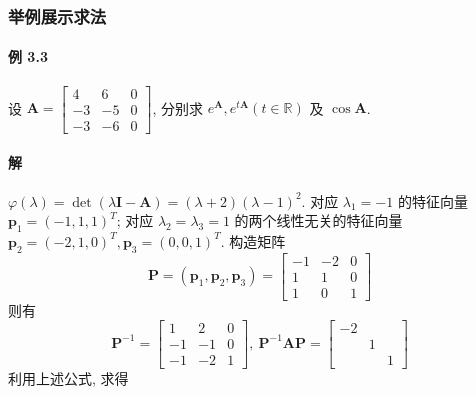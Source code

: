 \subsubsection{举例展示求法}

\paragraph*{例 3.3} 设 $\bm{A} = \begin{bmatrix}
    4 & 6 & 0 \\
    -3 & -5 & 0 \\
    -3 & -6 & 0
\end{bmatrix}$, 分别求 $e^{\bm{A}}, e^{t\bm{A}}(t\in \mathbb{R})$ 及 $\cos\bm{A}$.

\paragraph*{解} $\varphi(\lambda) = \det(\lambda\bm{I} - \bm{A}) = (\lambda + 2)(\lambda - 1)^2$. 对应
$\lambda_1 = -1$ 的特征向量 $\bm{p}_1 = (-1, 1, 1)^T$; 对应 $\lambda_2 = \lambda_3 = 1$ 的两个线性无关的特征向量 $\bm{p}_2 = (-2,1,0)^T, \bm{p}_3 = (0, 0, 1)^T$. 构造矩阵
$$
    \bm{P} = (\bm{p}_1, \bm{p}_2, \bm{p}_3) = \begin{bmatrix}
        -1 & -2 & 0 \\
        1  & 1  & 0 \\
        1  & 0  & 1
    \end{bmatrix}
$$
则有
$$
    \bm{P}^{-1} = \begin{bmatrix}
        1  & 2  & 0 \\
        -1 & -1 & 0 \\
        -1 & -2 & 1
    \end{bmatrix}, \ \bm{P}^{-1}\bm{AP} = \begin{bmatrix}
        -2 &   &   \\
           & 1 &   \\
           &   & 1
    \end{bmatrix}
$$
利用上述公式, 求得
